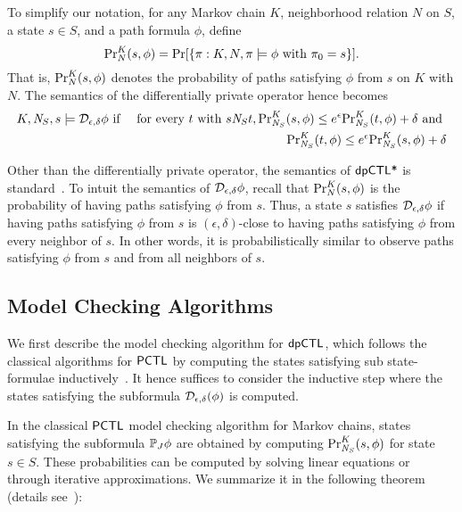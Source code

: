 To simplify our notation, for any Markov chain $K$, neighborhood
relation $N$ on $S$, a state $s \in S$, and a path formula $\phi$,
define
\[
\myPr{s}{K}{N}{\phi} =
\Pr [ \{ \pi : K, N, \pi \models \phi \textmd{ with } \pi_0 = s \} ].
\]
That is, $\myPr{s}{K}{N}{\phi}$ denotes the probability of paths
satisfying $\phi$ from $s$ on $K$ with $N$. The semantics of the
differentially private operator hence becomes
\begin{eqnarray*}
  K, \neighbor{S}, s \models \dpriv{\epsilon}{\delta} \phi
  & \textmd{ if } &
  \textmd{for every } t \textmd{ with }  s \neighbor{S} t,
      \myPr{s}{K}{\neighbor{S}}{\phi} \leq e^{\epsilon} 
      \myPr{t}{K}{\neighbor{S}}{\phi} + \delta
      \textmd{ and }\\
  & &  \myPr{t}{K}{\neighbor{S}}{\phi} \leq e^{\epsilon} 
       \myPr{s}{K}{\neighbor{S}}{\phi} + \delta
\end{eqnarray*}

Other than the differentially private operator, the semantics of
$\dpCTLstar$ is standard~\cite{BK:08:PMC}.
To intuit the semantics of $\dpriv{\epsilon}{\delta} \phi$,
recall that  $\myPr{s}{K}{N}{\phi}$ is the probability of having
paths satisfying $\phi$ from $s$. Thus, a state $s$ satisfies
$\dpriv{\epsilon}{\delta} \phi$ if having paths satisfying $\phi$
from $s$ is $(\epsilon, \delta)$-close to having paths satisfying
$\phi$ from every neighbor of $s$. In other words, it is
probabilistically similar to observe paths satisfying $\phi$ from $s$
and from all neighbors of $s$.

\subsection{Model Checking Algorithms}
We first describe the model checking algorithm for $\dpCTL$, which follows the classical
algorithms for $\PCTL$ by computing the states satisfying
sub state-formulae inductively~\cite{HanssonJ94,BK:08:PMC}. It hence suffices to
consider the inductive step where the states satisfying the subformula
$\dpriv{\epsilon}{\delta} (\phi)$ is computed.


In the classical $\PCTL$ model checking algorithm for Markov chains,
states satisfying the subformula $\PJ{J} \phi$ are obtained by
computing $\myPr{s}{K}{\neighbor{S}}{\phi}$ for state $s \in S$.
These probabilities can be computed by solving linear equations or
through iterative approximations. We summarize it in the following
theorem (details see~\cite{BK:08:PMC}):

